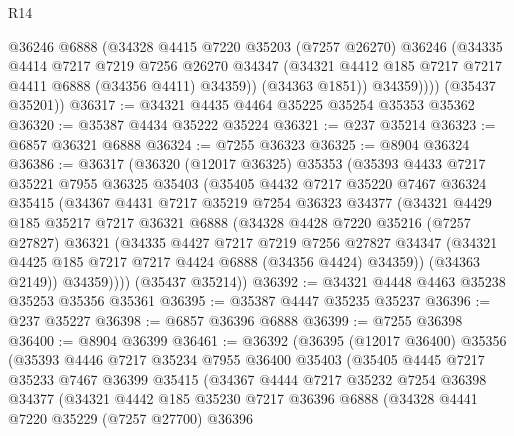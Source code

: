 \begin{lexlean}{R14}
\begin{coremodule}
              @36246
              @6888
              (@34328
                @4415
                @7220
                @35203
                (@7257 @26270)
                @36246
                (@34335
                  @4414
                  @7217
                  @7219
                  @7256
                  @26270
                  @34347
                  (@34321 @4412 @185 @7217 @7217 @4411 @6888 (@34356 @4411) @34359))
                (@34363 @1851))
              @34359))))
      (@35437 @35201))
@36317 := @34321 @4435 @4464 @35225 @35254 @35353 @35362
@36320 := @35387 @4434 @35222 @35224
@36321 := @237 @35214
@36323 := @6857 @36321 @6888
@36324 := @7255 @36323
@36325 := @8904 @36324
@36386 := @36317
    (@36320
      (@12017 @36325)
      @35353
      (@35393
        @4433
        @7217
        @35221
        @7955
        @36325
        @35403
        (@35405
          @4432
          @7217
          @35220
          @7467
          @36324
          @35415
          (@34367
            @4431
            @7217
            @35219
            @7254
            @36323
            @34377
            (@34321
              @4429
              @185
              @35217
              @7217
              @36321
              @6888
              (@34328
                @4428
                @7220
                @35216
                (@7257 @27827)
                @36321
                (@34335
                  @4427
                  @7217
                  @7219
                  @7256
                  @27827
                  @34347
                  (@34321 @4425 @185 @7217 @7217 @4424 @6888 (@34356 @4424) @34359))
                (@34363 @2149))
              @34359))))
      (@35437 @35214))
@36392 := @34321 @4448 @4463 @35238 @35253 @35356 @35361
@36395 := @35387 @4447 @35235 @35237
@36396 := @237 @35227
@36398 := @6857 @36396 @6888
@36399 := @7255 @36398
@36400 := @8904 @36399
@36461 := @36392
    (@36395
      (@12017 @36400)
      @35356
      (@35393
        @4446
        @7217
        @35234
        @7955
        @36400
        @35403
        (@35405
          @4445
          @7217
          @35233
          @7467
          @36399
          @35415
          (@34367
            @4444
            @7217
            @35232
            @7254
            @36398
            @34377
            (@34321
              @4442
              @185
              @35230
              @7217
              @36396
              @6888
              (@34328
                @4441
                @7220
                @35229
                (@7257 @27700)
                @36396

\end{coremodule}
\end{lexlean}
